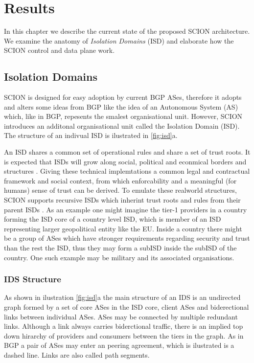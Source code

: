 \documentclass[../eva1_scion.tex]{subfiles}
\begin{document}
    \chapter{Results}
    In this chapter we describe the current state of the proposed SCION architecture. We examine the anatomy of \textit{Isolation Domains} (ISD) and elaborate how the SCION control and data plane work.

    \section{Isolation Domains}
    SCION is designed for easy adoption by current BGP ASes, therefore it adopts and alters some ideas from BGP like the idea of an Autonomous System (AS) which, like in BGP, repesents the smalest organisational unit. However, SCION introduces an additonal organisational unit called the Isolation Domain (ISD). The structure of an indivual ISD is ilustrated in \ref{fig:isd}a. 

    An ISD shares a common set of operational rules and share a set of trust roots. It is expected that ISDs will grow along social, political and econmical borders and structures \cite{scion_2011}. Giving these technical implemtations a common legal and contractual framework and social context, from which enforcability and a meaningful (for humans) sense of trust can be derived. To emulate these realworld structures, SCION supports recursive ISDs  which inherint trust roots and rules from their parent ISDs \cite{scion_2011}. As an example one might imagine the tier-1 providers in a country forming the ISD core of a country level ISD, which is member of an ISD representing larger geopolitical entity like the EU. Inside a country there might be a group of ASes which have stronger requirements regarding security and trust than the rest the ISD, thus they may form a subISD inside the subISD of the country. One such example may be military and its associated organisations.


    \subsection{IDS Structure}
    As shown in ilustration \ref{fig:isd}a the main structure of an IDS is an undirected graph formed by a set of core ASes in the ISD core, client ASes and biderectional links between individual ASes. ASes may be connected by multiple redundant links. Although a link always carries biderctional traffic, there is an implied top down hirarchy of providers and consumers between the tiers in the graph. As in BGP a pair of ASes may enter an peering agreement, which is ilustrated is a dashed line. Links are also called path segments.
\end{document}
